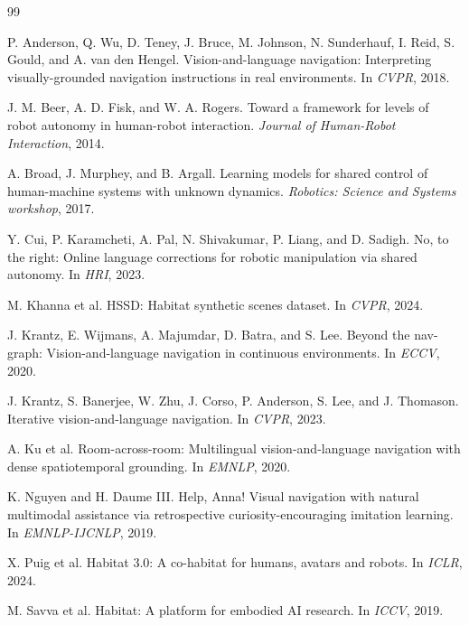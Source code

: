 \documentclass[10pt]{article}
\begin{document}
\begin{thebibliography}{99}

P. Anderson, Q. Wu, D. Teney, J. Bruce, M. Johnson, N. Sunderhauf,
I. Reid, S. Gould, and A. van den Hengel.
\newblock Vision-and-language navigation: Interpreting visually-grounded
navigation instructions in real environments.
\newblock In \emph{CVPR}, 2018.

J. M. Beer, A. D. Fisk, and W. A. Rogers.
\newblock Toward a framework for levels of robot autonomy in human-robot
interaction.
\newblock \emph{Journal of Human-Robot Interaction}, 2014.

A. Broad, J. Murphey, and B. Argall.
\newblock Learning models for shared control of human-machine systems with
unknown dynamics.
\newblock \emph{Robotics: Science and Systems workshop}, 2017.

Y. Cui, P. Karamcheti, A. Pal, N. Shivakumar, P. Liang, and D. Sadigh.
\newblock No, to the right: Online language corrections for robotic
manipulation via shared autonomy.
\newblock In \emph{HRI}, 2023.

M. Khanna et al.
\newblock HSSD: Habitat synthetic scenes dataset.
\newblock In \emph{CVPR}, 2024.

J. Krantz, E. Wijmans, A. Majumdar, D. Batra, and S. Lee.
\newblock Beyond the nav-graph: Vision-and-language navigation in continuous
environments.
\newblock In \emph{ECCV}, 2020.

J. Krantz, S. Banerjee, W. Zhu, J. Corso, P. Anderson, S. Lee, and J. Thomason.
\newblock Iterative vision-and-language navigation.
\newblock In \emph{CVPR}, 2023.

A. Ku et al.
\newblock Room-across-room: Multilingual vision-and-language navigation with
dense spatiotemporal grounding.
\newblock In \emph{EMNLP}, 2020.

K. Nguyen and H. Daume III.
\newblock Help, Anna! Visual navigation with natural multimodal assistance via
retrospective curiosity-encouraging imitation learning.
\newblock In \emph{EMNLP-IJCNLP}, 2019.

X. Puig et al.
\newblock Habitat 3.0: A co-habitat for humans, avatars and robots.
\newblock In \emph{ICLR}, 2024.

M. Savva et al.
\newblock Habitat: A platform for embodied AI research.
\newblock In \emph{ICCV}, 2019.


\end{thebibliography}
\end{document}
